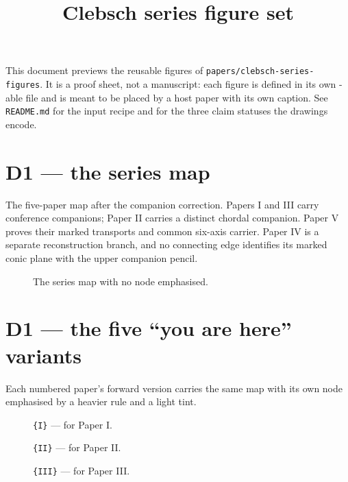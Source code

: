 \documentclass[11pt]{article}
\title{Clebsch series figure set}
\author{}
\date{}
\begin{document}
\maketitle
\thispagestyle{empty}

\noindent
This document previews the reusable figures of
\texttt{papers/clebsch-series-figures}.  It is a proof sheet, not a
manuscript: each figure is defined in its own \texttt{\string}-able
file and is meant to be placed by a host paper with its own caption.  See
\texttt{README.md} for the input recipe and for the three claim statuses
the drawings encode.

\clearpage
\section*{D1 --- the series map}

The five-paper map after the companion correction. Papers I and III carry
conference companions; Paper II carries a distinct chordal companion.
Paper V proves their marked transports and common six-axis carrier. Paper IV
is a separate reconstruction branch, and no connecting edge identifies its
marked conic plane with the upper companion pencil.

\bigskip
\begin{figure}[H]
\centering
{}
\caption{The series map with no node emphasised.}
\end{figure}

\clearpage
\section*{D1 --- the five ``you are here'' variants}

Each numbered paper's forward version carries the same map with its own
node emphasised by a heavier rule and a light tint.

\begin{figure}[H]
\centering
{}
\caption{\texttt{\string\ClebschSeriesMap\{I\}} --- for Paper I.}
\end{figure}

\begin{figure}[H]
\centering
{}
\caption{\texttt{\string\ClebschSeriesMap\{II\}} --- for Paper II.}
\end{figure}

\clearpage
\begin{figure}[H]
\centering
{}
\caption{\texttt{\string\ClebschSeriesMap\{III\}} --- for Paper III.}
\end{figure}
\end{document}
